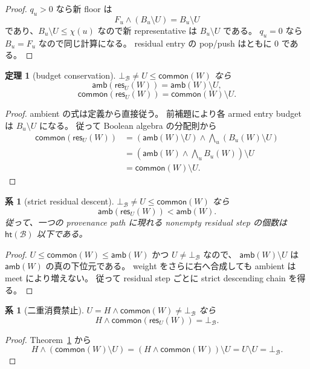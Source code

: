 \documentclass[uplatex,dvipdfmx,a4paper,10.5pt]{jsarticle}
\theoremstyle{jpplain}
\newtheorem{theorem}[definition]{定理}
\newtheorem{corollary}[definition]{系}
\newcommand{\Caps}{\mathcal B}
\newcommand{\botc}{\bot_{\Caps}}
\newcommand{\meet}{\mathbin{\wedge}}
\newcommand{\bigmeet}{\mathop{\bigwedge}}
\newcommand{\diff}{\mathbin{\setminus}}
\newcommand{\amb}{\mathsf{amb}}
\newcommand{\common}{\mathsf{common}}
\newcommand{\res}{\mathsf{res}}
\newcommand{\seed}{\chi}
\newcommand{\capheight}{\mathsf{ht}}
\begin{document}
\begin{proof}
$q_u>0$ なら新 floor は
\[
 F_u\meet(B_u\diff U)=B_u\diff U
\]
であり、$B_u\diff U\leq\seed(u)$ なので新 representative は
$B_u\diff U$ である。
$q_u=0$ なら $B_u=F_u$ なので同じ計算になる。
residual entry の pop/push はともに 0 である。
\end{proof}

\begin{theorem}[budget conservation]
\label{thm:budget-conservation}
$\botc\neq U\leq\common(W)$ なら
\[
  \amb(\res_U(W))=\amb(W)\diff U,
\]
\[
  \common(\res_U(W))=\common(W)\diff U.
\]
\end{theorem}

\begin{proof}
ambient の式は定義から直接従う。
前補題により各 armed entry budget は $B_u\diff U$ になる。
従って Boolean algebra の分配則から
\[
\begin{split}
 \common(\res_U(W))
 &= (\amb(W)\diff U)
    \meet\bigmeet_u(B_u(W)\diff U)\\
 &= \left(\amb(W)\meet\bigmeet_uB_u(W)\right)\diff U\\
 &= \common(W)\diff U.
\end{split}
\]
\end{proof}

\begin{corollary}[strict residual descent]
\label{cor:strict-descent}
$\botc\neq U\leq\common(W)$ なら
\[
  \amb(\res_U(W))<\amb(W).
\]
従って、一つの provenance path に現れる nonempty residual step の個数は
$\capheight(\Caps)$ 以下である。
\end{corollary}

\begin{proof}
$U\leq\common(W)\leq\amb(W)$ かつ $U\neq\botc$ なので、
$\amb(W)\diff U$ は $\amb(W)$ の真の下位元である。
weight をさらに右へ合成しても ambient は meet により増えない。
従って residual step ごとに strict descending chain を得る。
\end{proof}

\begin{corollary}[二重消費禁止]
$U=H\meet\common(W)\neq\botc$ なら
\[
  H\meet\common(\res_U(W))=\botc.
\]
\end{corollary}

\begin{proof}
Theorem~\ref{thm:budget-conservation} から
\[
 H\meet(\common(W)\diff U)
 =(H\meet\common(W))\diff U
 =U\diff U=\botc.
\]
\end{proof}
\end{document}
